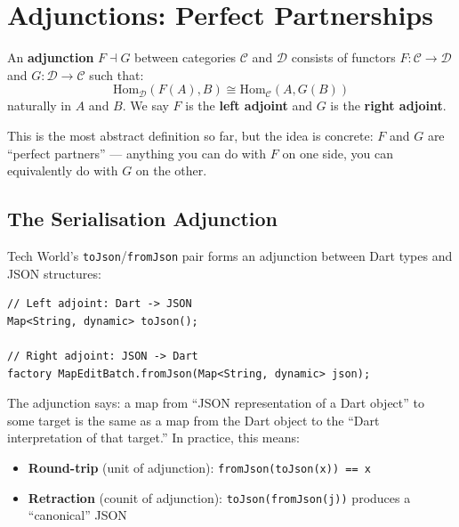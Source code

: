 \documentclass[12pt,a4paper]{article}
\theoremstyle{definition}
\theoremstyle{plain}
\theoremstyle{remark}
\begin{document}
\section{Adjunctions: Perfect Partnerships}
\label{sec:adjunctions}

\begin{formal}
An \textbf{adjunction} $F \dashv G$ between categories $\mathcal{C}$ and
$\mathcal{D}$ consists of functors $F \colon \mathcal{C} \to \mathcal{D}$
and $G \colon \mathcal{D} \to \mathcal{C}$ such that:
\[
\mathrm{Hom}_{\mathcal{D}}(F(A), B) \cong \mathrm{Hom}_{\mathcal{C}}(A, G(B))
\]
naturally in $A$ and $B$. We say $F$ is the \textbf{left adjoint} and $G$
is the \textbf{right adjoint}.
\end{formal}

This is the most abstract definition so far, but the idea is concrete:
$F$ and $G$ are ``perfect partners'' --- anything you can do with $F$
on one side, you can equivalently do with $G$ on the other.

\subsection{The Serialisation Adjunction}

Tech World's \texttt{toJson}/\texttt{fromJson} pair forms an adjunction
between Dart types and JSON structures:

\begin{lstlisting}
// Left adjoint: Dart -> JSON
Map<String, dynamic> toJson();

// Right adjoint: JSON -> Dart
factory MapEditBatch.fromJson(Map<String, dynamic> json);
\end{lstlisting}

The adjunction says: a map from ``JSON representation of a Dart object''
to some target is the same as a map from the Dart object to the ``Dart
interpretation of that target.'' In practice, this means:

\begin{itemize}
  \item \textbf{Round-trip} (unit of adjunction):
        \texttt{fromJson(toJson(x)) == x}
  \item \textbf{Retraction} (counit of adjunction):
        \texttt{toJson(fromJson(j))} produces a ``canonical'' JSON
\end{itemize}
\end{document}
